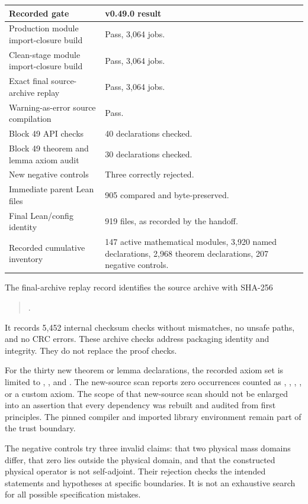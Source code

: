 \begin{longtable}{@{}p{}p{}@{}}
\toprule
Recorded gate & v0.49.0 result\\
\midrule
\endhead
Production module import-closure build & Pass, 3,064 jobs.\\
Clean-stage module import-closure build & Pass, 3,064 jobs.\\
Exact final source-archive replay & Pass, 3,064 jobs.\\
Warning-as-error source compilation & Pass.\\
Block 49 API checks & 40 declarations checked.\\
Block 49 theorem and lemma axiom audit & 30 declarations checked.\\
New negative controls & Three correctly rejected.\\
Immediate parent Lean files & 905 compared and byte-preserved.\\
Final Lean/config identity & 919 files, as recorded by the handoff.\\
Recorded cumulative inventory & 147 active mathematical modules, 3,920 named declarations, 2,968 theorem declarations, 207 negative controls.\\
\bottomrule
\end{longtable}

The final-archive replay record identifies the source archive with SHA-256
\begin{quote}\small
{}.
\end{quote}
It records 5,452 internal checksum checks without mismatches, no unsafe paths, and no CRC errors. These archive checks address packaging identity and integrity. They do not replace the proof checks.

For the thirty new theorem or lemma declarations, the recorded axiom set is limited to , , and . The new-source scan reports zero occurrences counted as , , , , or a custom axiom. The scope of that new-source scan should not be enlarged into an assertion that every dependency was rebuilt and audited from first principles. The pinned compiler and imported library environment remain part of the trust boundary.

The negative controls try three invalid claims: that two physical mass domains differ, that zero lies outside the physical domain, and that the constructed physical operator is not self-adjoint. Their rejection checks the intended statements and hypotheses at specific boundaries. It is not an exhaustive search for all possible specification mistakes.


